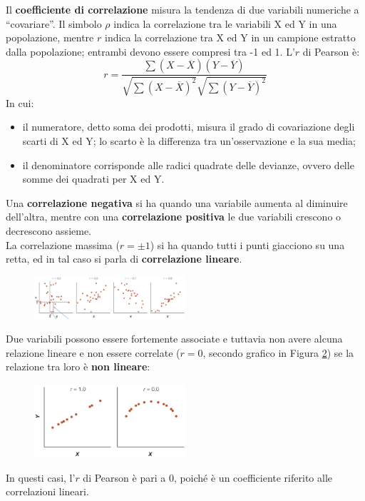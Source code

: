 \documentclass[10pt, draft]{book}
\newcommand{\tightlist}{%
\setlength{\itemsep}{1pt}\setlength{\parskip}{0pt}\setlength{\parsep}{0pt}}
\begin{document}
Il \textbf{coefficiente di correlazione} misura la tendenza di due variabili numeriche a ``covariare''. Il simbolo $\rho$ indica la correlazione tra le variabili X ed Y in una popolazione, mentre $r$ indica la correlazione tra X ed Y in un campione estratto dalla popolazione; entrambi devono essere compresi tra -1 ed 1. L'$r$ di Pearson è:
\begin{equation}
    r = \frac{\sum{(X-\overline{X})(Y-\overline{Y})}}{\sqrt{\sum{(X-\overline{X})^2}}\sqrt{\sum{(Y-\overline{Y})^2}}}
\end{equation}
In cui:
\begin{itemize}\tightlist
    \item il numeratore, detto soma dei prodotti, misura il grado di covariazione degli scarti di X ed Y; lo scarto è la differenza tra un'osservazione e la sua media;
    \item il denominatore corrisponde alle radici quadrate delle devianze, ovvero delle somme dei quadrati per X ed Y.
\end{itemize}
Una \textbf{correlazione negativa} si ha quando una variabile aumenta al diminuire dell'altra, mentre con una \textbf{correlazione positiva} le due variabili crescono o decrescono assieme.\\
La correlazione massima ($r = \pm1$) si ha quando tutti i punti giacciono su una retta, ed in tal caso si parla di \textbf{correlazione lineare}.\\
\begin{figure}[H]
    \centering
    \includegraphics[width=0.5\textwidth]{fig16.1-2}
    \caption{\small{}}
    \label{fig16.1-2}
\end{figure}
Due variabili possono essere fortemente associate e tuttavia non avere alcuna relazione lineare e non essere correlate ($r=0$, secondo grafico in Figura \ref{fig16.1-3}) se la relazione tra loro è \textbf{non lineare}:
\begin{figure}[H]
    \centering
    \includegraphics[width=0.5\textwidth]{fig16.1-3}
    \caption{\small{}}
    \label{fig16.1-3}
\end{figure}
In questi casi, l'$r$ di Pearson è pari a 0, poiché è un coefficiente riferito alle correlazioni lineari.\\
\end{document}
